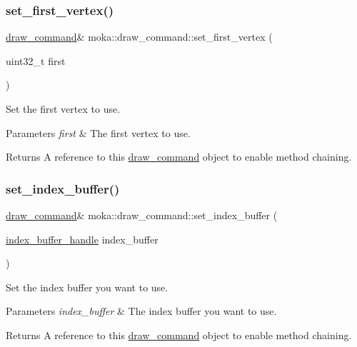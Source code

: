 \subsubsection{\texorpdfstring{set\_first\_vertex()}{set\_first\_vertex()}}
{\footnotesize\ttfamily \mbox{\hyperlink{classmoka_1_1draw__command}{draw\+\_\+command}}\& moka\+::draw\+\_\+command\+::set\+\_\+first\+\_\+vertex (\begin{DoxyParamCaption}\item[{uint32\+\_\+t}]{first }\end{DoxyParamCaption})}



Set the first vertex to use. 


\begin{DoxyParams}{Parameters}
{\em first} & The first vertex to use. \\
\hline
\end{DoxyParams}
\begin{DoxyReturn}{Returns}
A reference to this \mbox{\hyperlink{classmoka_1_1draw__command}{draw\+\_\+command}} object to enable method chaining. 
\end{DoxyReturn}
\mbox{\label{classmoka_1_1draw__command_aee4541756627cf7a1cc7d495c815b3c9}} 
\subsubsection{\texorpdfstring{set\_index\_buffer()}{set\_index\_buffer()}}
{\footnotesize\ttfamily \mbox{\hyperlink{classmoka_1_1draw__command}{draw\+\_\+command}}\& moka\+::draw\+\_\+command\+::set\+\_\+index\+\_\+buffer (\begin{DoxyParamCaption}\item[{\mbox{\hyperlink{structmoka_1_1index__buffer__handle}{index\+\_\+buffer\+\_\+handle}}}]{index\+\_\+buffer }\end{DoxyParamCaption})}



Set the index buffer you want to use. 


\begin{DoxyParams}{Parameters}
{\em index\+\_\+buffer} & The index buffer you want to use. \\
\hline
\end{DoxyParams}
\begin{DoxyReturn}{Returns}
A reference to this \mbox{\hyperlink{classmoka_1_1draw__command}{draw\+\_\+command}} object to enable method chaining. 
\end{DoxyReturn}
\mbox{\label{classmoka_1_1draw__command_aba3925099a593478027634f65177ecea}} 

